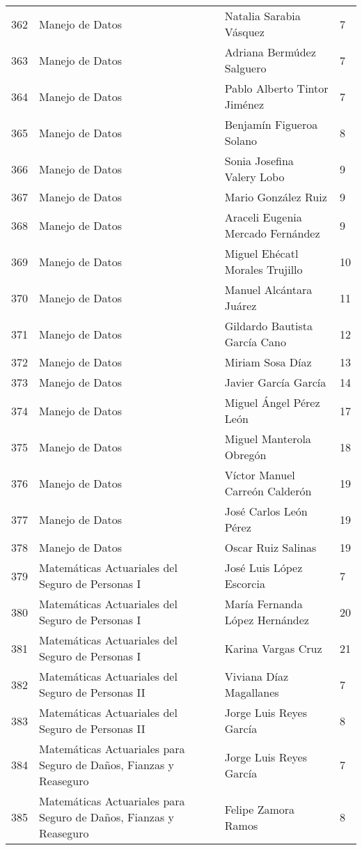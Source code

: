 \begin{table}[ht]
\begin{tabular}{rlll}
  362 & Manejo de Datos & Natalia Sarabia Vásquez & 7 \\ 
  363 & Manejo de Datos & Adriana Bermúdez Salguero & 7 \\ 
  364 & Manejo de Datos & Pablo Alberto Tintor Jiménez & 7 \\ 
  365 & Manejo de Datos & Benjamín Figueroa Solano & 8 \\ 
  366 & Manejo de Datos & Sonia Josefina Valery Lobo & 9 \\ 
  367 & Manejo de Datos & Mario González Ruiz & 9 \\ 
  368 & Manejo de Datos & Araceli Eugenia Mercado Fernández & 9 \\ 
  369 & Manejo de Datos & Miguel Ehécatl Morales Trujillo & 10 \\ 
  370 & Manejo de Datos & Manuel Alcántara Juárez & 11 \\ 
  371 & Manejo de Datos & Gildardo Bautista García Cano & 12 \\ 
  372 & Manejo de Datos & Miriam Sosa Díaz & 13 \\ 
  373 & Manejo de Datos & Javier García García & 14 \\ 
  374 & Manejo de Datos & Miguel Ángel Pérez León & 17 \\ 
  375 & Manejo de Datos & Miguel Manterola Obregón & 18 \\ 
  376 & Manejo de Datos & Víctor Manuel Carreón Calderón & 19 \\ 
  377 & Manejo de Datos & José Carlos León Pérez & 19 \\ 
  378 & Manejo de Datos & Oscar Ruiz Salinas & 19 \\ 
  379 & Matemáticas Actuariales del Seguro de Personas I & José Luis López Escorcia & 7 \\ 
  380 & Matemáticas Actuariales del Seguro de Personas I & María Fernanda López Hernández & 20 \\ 
  381 & Matemáticas Actuariales del Seguro de Personas I & Karina Vargas Cruz & 21 \\ 
  382 & Matemáticas Actuariales del Seguro de Personas II & Viviana Díaz Magallanes & 7 \\ 
  383 & Matemáticas Actuariales del Seguro de Personas II & Jorge Luis Reyes García & 8 \\ 
  384 & Matemáticas Actuariales para Seguro de Daños, Fianzas y Reaseguro & Jorge Luis Reyes García & 7 \\ 
  385 & Matemáticas Actuariales para Seguro de Daños, Fianzas y Reaseguro & Felipe Zamora Ramos & 8 \\ 

\end{tabular}
\end{table}
